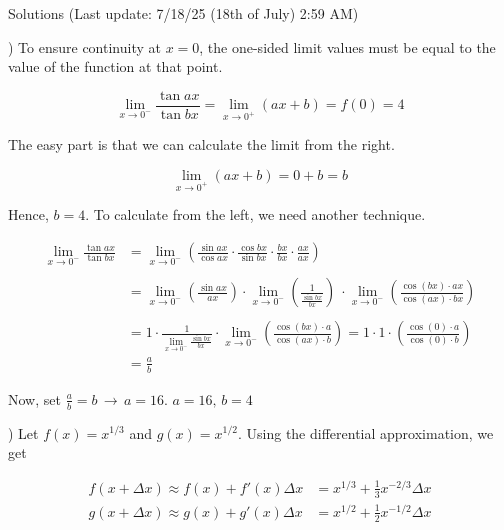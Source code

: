 \documentclass{article}
\begin{document}
\newpage

\begin{center}
Solutions (Last update: 7/18/25 (18th of July) 2:59 AM)
\end{center}

) To ensure continuity at $x=0$, the one-sided limit values must be equal to the value of the function at that point.

\begin{equation*}
\lim_{x\to0^-} \frac{\tan ax}{\tan bx} = \lim_{x\to0^+} (ax+b) = f(0) = 4
\end{equation*}

\hfill

\noindent The easy part is that we can calculate the limit from the right.

\begin{equation*}
\lim_{x\to0^+} (ax+b) = 0+b = b
\end{equation*}

\hfill

\noindent Hence, $b=4$. To calculate from the left, we need another technique.

\begin{align*}
\lim_{x\to0^-} \frac{\tan ax}{\tan bx} &= \lim_{x\to0^-} \left(\frac{\sin ax}{\cos ax} \cdot \frac{\cos bx}{\sin bx} \cdot \frac{bx}{bx}\cdot \frac{ax}{ax}\right)\\\\&=\lim_{x\to0^-} \left(\frac{\sin ax}{ax} \right)\cdot \lim_{x\to0^-} \left(\frac1{ \frac{\sin bx}{bx}}\right)\ \cdot \lim_{x\to0^-} \left(\frac{\cos (bx) \cdot ax}{\cos(ax) \cdot bx}\right)\\\\&=1\cdot  \frac1{\displaystyle \lim_{x\to0^-} \frac{\sin bx}{bx} }\cdot \lim_{x\to0^-} \left(\frac{\cos (bx) \cdot a}{\cos(ax) \cdot b}\right)= 1\cdot 1\cdot\left(\frac{\cos(0) \cdot a}{\cos(0) \cdot b}\right)\\&=\frac ab
\end{align*}

\hfill

\noindent Now, set $\displaystyle \frac ab = b\,\rightarrow\, a= 16$. $\boxed{a=16,\,b=4}$

\hfill

) Let $f(x) = x^{1/3}$ and $g(x) = x^{1/2}$. Using the differential approximation, we get

\begin{align*}
f(x+\Delta x)\approx f(x) + f'(x)\Delta x&=x^{1/3}+\frac13x^{-2/3}\Delta x\\
g(x+\Delta x)\approx g(x) + g'(x)\Delta x&=x^{1/2}+\frac12x^{-1/2}\Delta x
\end{align*}
\end{document}
